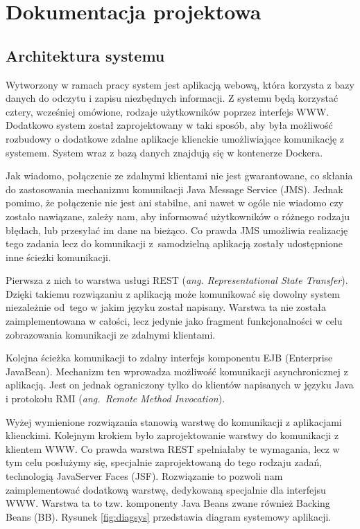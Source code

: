 \chapter{Dokumentacja projektowa}

\section{Architektura systemu}
Wytworzony w ramach pracy system jest aplikacją webową, która korzysta z bazy danych do odczytu i zapisu niezbędnych informacji. Z systemu będą korzystać cztery, wcześniej omówione, rodzaje użytkowników poprzez interfejs WWW. Dodatkowo system został zaprojektowany w taki sposób, aby była możliwość rozbudowy o dodatkowe zdalne aplikacje klienckie umożliwiające komunikację z systemem. System wraz z bazą danych znajdują się w kontenerze Dockera.

Jak wiadomo, połączenie ze zdalnymi klientami nie jest gwarantowane, co skłania do zastosowania mechanizmu komunikacji Java Message Service (JMS). Jednak pomimo, że połączenie nie jest ani stabilne, ani nawet w ogóle nie wiadomo czy zostało nawiązane, zależy nam, aby informować użytkowników o różnego rodzaju błędach, lub przesyłać im dane na bieżąco. Co prawda JMS umożliwia realizację tego zadania lecz do komunikacji z~samodzielną aplikacją zostały udostępnione inne ścieżki komunikacji. 

Pierwsza z nich to warstwa usługi REST (\textit{ang. Representational State Transfer}). Dzięki takiemu rozwiązaniu z aplikacją może komunikować się dowolny system niezależnie od~tego w jakim języku został napisany. Warstwa ta nie została zaimplementowana w całości, lecz jedynie jako fragment funkcjonalności w celu zobrazowania komunikacji ze zdalnymi klientami.

Kolejna ścieżka komunikacji to zdalny interfejs komponentu EJB (Enterprise JavaBean). Mechanizm ten wprowadza możliwość komunikacji asynchronicznej z aplikacją. Jest on jednak ograniczony tylko do klientów napisanych w języku Java i protokołu RMI (\textit{ang.~Remote Method Invocation}).

Wyżej wymienione rozwiązania stanowią warstwę do komunikacji z aplikacjami klienckimi. Kolejnym krokiem było zaprojektowanie warstwy do komunikacji z klientem WWW. Co prawda warstwa REST spełniałaby te wymagania, lecz w tym celu posłużymy się, specjalnie zaprojektowaną do tego rodzaju zadań, technologią JavaServer Faces (JSF). Rozwiązanie to pozwoli nam zaimplementować dodatkową warstwę, dedykowaną specjalnie dla interfejsu WWW. Warstwa ta to tzw. komponenty Java Beans zwane również Backing Beans (BB). Rysunek \ref{fig:diagsys} przedstawia diagram systemowy aplikacji.

